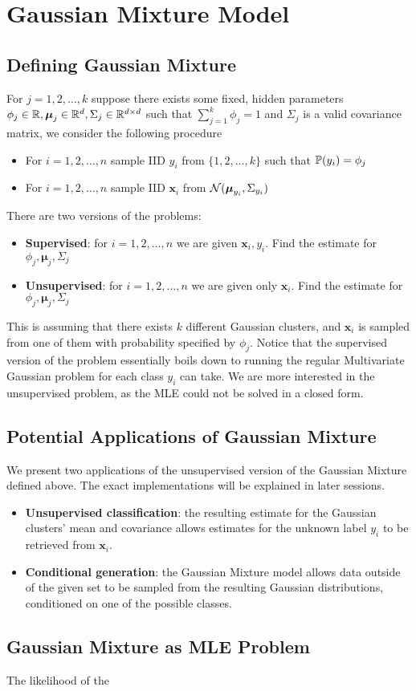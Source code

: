 \section{Gaussian Mixture Model}
\subsection{Defining Gaussian Mixture}
\begin{definition}
    For $j=1,2,\dots,k$ suppose there exists some fixed, hidden parameters $\phi_j \in \mathbb{R},\boldsymbol{\mu}_j \in \mathbb{R}^d,\Sigma_j \in \mathbb{R}^{d\times d}$ such that $\sum_{j=1}^k \phi_j = 1$ and $\Sigma_j$ is a valid covariance matrix, we consider the following procedure
    \begin{itemize}
        \item For $i=1,2,\dots,n$ sample IID $y_i$ from $\{1,2,\dots,k\}$ such that $\mathbb{P}(y_i)=\phi_j$
        \item For $i=1,2,\dots,n$ sample IID $\textbf{x}_i$ from $\mathcal{N}(\boldsymbol{\mu}_{y_i},\Sigma_{y_i})$
    \end{itemize}
    There are two versions of the problems:
    \begin{itemize}
        \item \textbf{Supervised}: for $i=1,2,\dots,n$ we are given $\textbf{x}_i,y_i$. Find the estimate for $\phi_j,\boldsymbol{\mu}_j,\Sigma_j$
        \item \textbf{Unsupervised}: for $i=1,2,\dots,n$ we are given only $\textbf{x}_i$. Find the estimate for $\phi_j,\boldsymbol{\mu}_j,\Sigma_j$
    \end{itemize}
\end{definition}
This is assuming that there exists $k$ different Gaussian clusters, and $\mathbf{x}_i$ is sampled from one of them with probability specified by $\phi_j$. Notice that the supervised version of the problem essentially boils down to running the regular Multivariate Gaussian problem for each class $y_i$ can take. We are more interested in the unsupervised problem, as the MLE could not be solved in a closed form.
\subsection{Potential Applications of Gaussian Mixture}
We present two applications of the unsupervised version of the Gaussian Mixture defined above. The exact implementations will be explained in later sessions.
\begin{itemize}
    \item \textbf{Unsupervised classification}: the resulting estimate for the Gaussian clusters' mean and covariance allows estimates for the unknown label $y_i$ to be retrieved from $\textbf{x}_i$.
    \item \textbf{Conditional generation}: the Gaussian Mixture model allows data outside of the given set to be sampled from the resulting Gaussian distributions, conditioned on one of the possible classes.
\end{itemize}
\subsection{Gaussian Mixture as MLE Problem}
The likelihood of the 